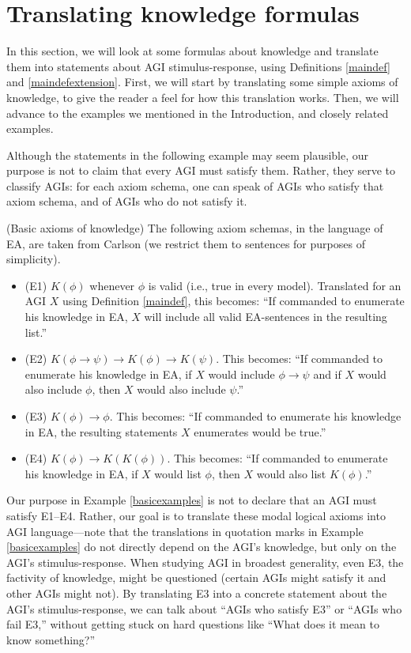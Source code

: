 \documentclass[runningheads]{llncs}
\begin{document}
\section{Translating knowledge formulas}
\label{appsection}

In this section, we will look at some formulas about knowledge and translate them into
statements about AGI stimulus-response, using
Definitions \ref{maindef} and \ref{maindefextension}.
First, we will start by translating some simple axioms of knowledge, to give the reader
a feel for how this translation works. Then, we will advance to the examples we mentioned
in the Introduction, and closely related examples.

Although the statements in the following example may seem plausible,
our purpose is not to claim that every AGI must satisfy them.
Rather, they serve to classify AGIs:
for each axiom schema, one can speak of AGIs who satisfy that axiom schema, and
of AGIs who do not satisfy it.

\begin{example}
\label{basicexamples}
  (Basic axioms of knowledge) The following axiom schemas, in the language
  of EA, are taken from Carlson \cite{carlson}
  (we restrict them to sentences for purposes of simplicity).
  \begin{itemize}
    \item (E1) $K(\phi)$ whenever $\phi$ is valid (i.e., true in every model).
    Translated for an AGI $X$ using Definition \ref{maindef}, this becomes:
    ``If commanded to enumerate his knowledge in EA, $X$ will include
    all valid EA-sentences in the resulting list.''
    \item (E2) $K(\phi\rightarrow\psi)\rightarrow K(\phi)\rightarrow K(\psi)$.
    This becomes: ``If commanded to enumerate his knowledge in EA,
    if $X$ would include $\phi\rightarrow\psi$ and if $X$ would also include
    $\phi$, then $X$ would also include $\psi$.''
    \item (E3) $K(\phi)\rightarrow\phi$. This becomes: ``If commanded to enumerate
    his knowledge in EA, the resulting statements $X$ enumerates
    would be true.''
    \item (E4) $K(\phi)\rightarrow K(K(\phi))$. This becomes: ``If commanded to
    enumerate his knowledge in EA, if $X$ would list $\phi$,
    then $X$ would also list $K(\phi)$.''
  \end{itemize}
\end{example}

Our purpose in Example \ref{basicexamples} is not to declare that an
AGI must satisfy E1--E4. Rather, our goal is to translate these
modal logical axioms into AGI language---note that the translations in quotation
marks in Example \ref{basicexamples} do not directly depend on
the AGI's knowledge, but only on the AGI's stimulus-response.
When studying AGI in broadest generality,
even E3, the factivity of knowledge, might be questioned (certain AGIs might satisfy
it and other AGIs might not). By translating E3 into
a concrete statement about the AGI's stimulus-response,
we can talk about ``AGIs who satisfy E3'' or
``AGIs who fail E3,'' without getting stuck on hard questions
like ``What does it mean to know something?''
\end{document}
